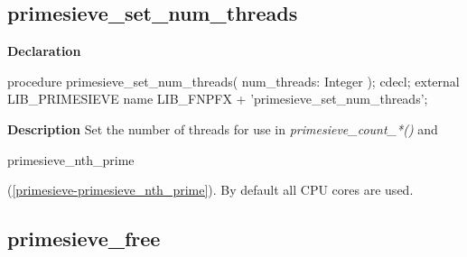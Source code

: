 \documentclass{report}
\newif\ifpdf
\begin{document}
\subsection*{primesieve{\_}set{\_}num{\_}threads}
\fi
\label{primesieve-primesieve_set_num_threads}
\begin{list}{}{
\setlength{\itemindent}{0cm}
\setlength{\listparindent}{0cm}
\setlength{\leftmargin}{\evensidemargin}
\addtolength{\leftmargin}{\tmplength}
\settowidth{\labelsep}{X}
\addtolength{\leftmargin}{\labelsep}
\setlength{\labelwidth}{\tmplength}
}
\item[\textbf{Declaration}\hfill]
\ifpdf
\begin{flushleft}
\fi
\begin{ttfamily}
procedure primesieve{\_}set{\_}num{\_}threads( num{\_}threads: Integer ); cdecl; external LIB{\_}PRIMESIEVE name LIB{\_}FNPFX + 'primesieve{\_}set{\_}num{\_}threads';\end{ttfamily}

\ifpdf
\end{flushleft}
\fi

\par
\item[\textbf{Description}]
Set the number of threads for use in \textit{primesieve{\_}count{\_}*()} and \begin{ttfamily}primesieve{\_}nth{\_}prime\end{ttfamily}(\ref{primesieve-primesieve_nth_prime}). By default all CPU cores are used.

\end{list}
\ifpdf
\subsection*{\large{\textbf{primesieve{\_}free}}\normalsize\hspace{1ex}\hrulefill}
\else
\end{document}
